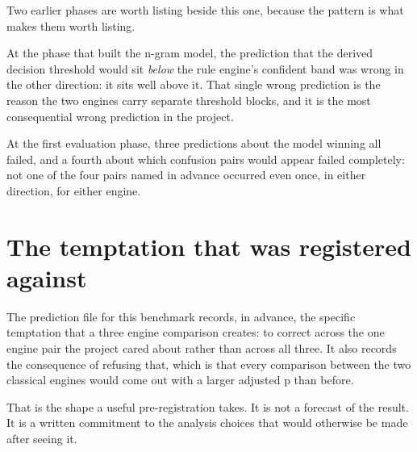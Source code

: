 Two earlier phases are worth listing beside this one, because the pattern is what
makes them worth listing.

At the phase that built the n-gram model, the prediction that the derived
decision threshold would sit \emph{below} the rule engine's confident band was
wrong in the other direction: it sits well above it. That single wrong prediction
is the reason the two engines carry separate threshold blocks, and it is the most
consequential wrong prediction in the project.

At the first evaluation phase, three predictions about the model winning all
failed, and a fourth about which confusion pairs would appear failed completely:
not one of the four pairs named in advance occurred even once, in either
direction, for either engine.

\section{The temptation that was registered against}

The prediction file for this benchmark records, in advance, the specific
temptation that a three engine comparison creates: to correct across the one
engine pair the project cared about rather than across all three. It also records
the consequence of refusing that, which is that every comparison between the two
classical engines would come out with a larger adjusted p than before.

That is the shape a useful pre-registration takes. It is not a forecast of the
result. It is a written commitment to the analysis choices that would otherwise
be made after seeing it.
